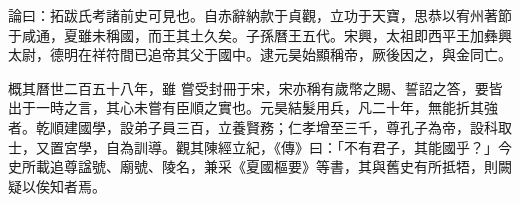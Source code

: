 \begin{pinyinscope}
 論曰：拓跋氏考諸前史可見也。自赤辭納款于貞觀，立功于天寶，思恭以宥州著節于咸通，夏雖未稱國，而王其土久矣。子孫曆王五代。宋興，太祖即西平王加彝興太尉，德明在祥符間已追帝其父于國中。逮元昊始顯稱帝，厥後因之，與金同亡。



 概其曆世二百五十八年，雖
 嘗受封冊于宋，宋亦稱有歲幣之賜、誓詔之答，要皆出于一時之言，其心未嘗有臣順之實也。元昊結髮用兵，凡二十年，無能折其強者。乾順建國學，設弟子員三百，立養賢務；仁孝增至三千，尊孔子為帝，設科取士，又置宮學，自為訓導。觀其陳經立紀，《傳》曰：「不有君子，其能國乎？」今史所載追尊諡號、廟號、陵名，兼采《夏國樞要》等書，其與舊史有所抵牾，則闕疑以俟知者焉。



\end{pinyinscope}
